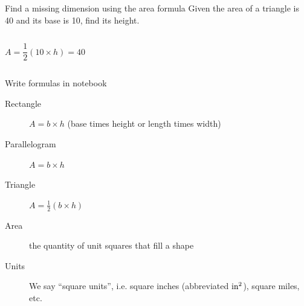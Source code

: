 \begin{frame}{Find a missing dimension using the area formula}
    Given the area of a triangle is 40 and its base is 10, find its height. \vspace{1cm}
    \begin{columns}
        $$A =  \frac{1}{2} (10 \times h) = 40$$
    \end{columns} \vspace{1.5cm}
    \end{frame}

\begin{frame}{Write formulas in notebook}
        \begin{description}
            \item[Rectangle] $A=b \times h$ (base times height or length times width)
            \item[Parallelogram] $A=b \times h$
            \item[Triangle] $A=\frac{1}{2} (b \times h)$ \vspace{0.5cm}
            \item[Area] the quantity of unit squares that fill a shape
            \item[Units] We say ``square units'', i.e. square inches (abbreviated $\rm{in}^2$), square miles, etc.
        \end{description}
    \end{frame}
    
